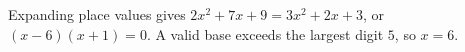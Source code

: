 Expanding place values gives $ 2x^2+7x+9=3x^2+2x+3 $, or $(x-6)(x+1)=0 $. A valid base exceeds the largest digit $ 5 $, so $\boxed{x=6}$.
